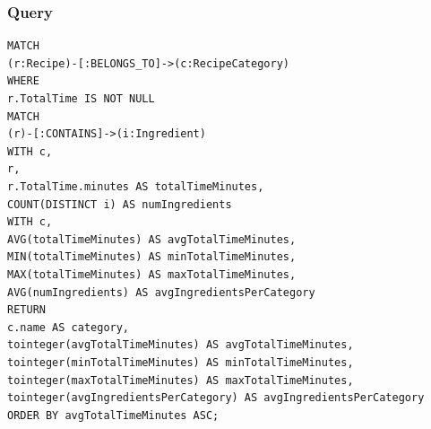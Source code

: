 \begin{enumerate}
    \subsubsection{Query}
    \begin{verbatim}
MATCH 
(r:Recipe)-[:BELONGS_TO]->(c:RecipeCategory)
WHERE 
r.TotalTime IS NOT NULL
MATCH 
(r)-[:CONTAINS]->(i:Ingredient)
WITH c, 
r, 
r.TotalTime.minutes AS totalTimeMinutes,
COUNT(DISTINCT i) AS numIngredients
WITH c, 
AVG(totalTimeMinutes) AS avgTotalTimeMinutes,
MIN(totalTimeMinutes) AS minTotalTimeMinutes,
MAX(totalTimeMinutes) AS maxTotalTimeMinutes,
AVG(numIngredients) AS avgIngredientsPerCategory
RETURN 
c.name AS category,
tointeger(avgTotalTimeMinutes) AS avgTotalTimeMinutes,
tointeger(minTotalTimeMinutes) AS minTotalTimeMinutes,
tointeger(maxTotalTimeMinutes) AS maxTotalTimeMinutes,
tointeger(avgIngredientsPerCategory) AS avgIngredientsPerCategory
ORDER BY avgTotalTimeMinutes ASC;
    \end{verbatim}

\end{enumerate}
